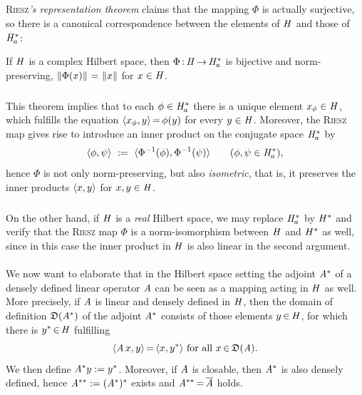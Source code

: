 \documentclass[11pt,twoside]{article}
\begin{document}
\begin{itemize}[leftmargin=4mm,itemsep=6pt]
\subparagraph{} %
\textsc{Riesz}\textit{'s representation theorem} claims
that the mapping $\Phi$ is actually surjective,
so there is a canonical correspondence
between the elements of $\mathit{H}$ and those of $\mathit{H}_a^*$:

\begin{theorem1}\label{RIESZ_REPRESENTATION_THEOREM}
If $\mathit{H}$ is a complex Hilbert space,
then $\Phi{\,:\,} \mathit{H} {\,\to\,} \mathit{H}_a^*$ is bijective and norm-preserving,
{\ie}
$\left\lVert \Phi(x) \right\rVert {\,=\,} \left\lVert x \right\rVert$ for $x \in \mathit{H}$.
\end{theorem1}

\subparagraph{}
This theorem implies that
to each $\phi \in \mathit{H}_a^*$
there is a unique element $x_{\phi} \in \mathit{H}$,
which fulfills the equation
$\langle x_{\phi},y \rangle {\,=\,} \phi(y)$ for every $y \in \mathit{H}$.
Moreover,
the \textsc{Riesz} map gives rise to introduce an inner product
on the conjugate space $\mathit{H}_a^*$ by
\[
\langle \phi,\psi \rangle \, \,:=\, \, \langle \Phi^{-1}(\phi),\Phi^{-1}(\psi) \rangle
\quad \quad (\phi,\psi \in \mathit{H}_a^*),
\]
hence $\Phi$ is not only norm-preserving,
but also \textit{isometric},
that is,
it preserves the inner products $\langle x,y \rangle$ for $x,y \in \mathit{H}$.

\subparagraph{} %
On the other hand,
if $\mathit{H}$ is a \textit{real} Hilbert space,
we may replace $\mathit{H}_a^*$ by $\mathit{H}^*$ and verify
that the \textsc{Riesz} map $\Phi$ is a norm-isomorphism
between $\mathit{H}$ and $\mathit{H}^*$ as well,
since in this case
the inner product in $\mathit{H}$ is also linear in the second argument.
\end{itemize}

\paragraph{} %
We now want to elaborate
that in the Hilbert space setting
the adjoint $\mathit{A}^*$ of a densely defined linear operator $\mathit{A}$
can be seen as a mapping acting in $\mathit{H}$ as well.
More precisely,
if $\mathit{A}$ is linear and densely defined in $\mathit{H}$,
then the domain of definition $\mathfrak{D}(\mathit{A}^*)$
of the adjoint $\mathit{A}^*$ consists of those elements $y {\,\in\,} \mathit{H}$,
for which there is $y^* {\,\in\,} \mathit{H}$ fulfilling
\[
\langle \mathit{A} \,x,y \rangle {\,=\,} \langle x,y^* \rangle \mbox{ for all } x {\,\in\,} \mathfrak{D}(\mathit{A}).
\]
We then define $\mathit{A}^* y := y^*$.
Moreover,
if $\mathit{A}$ is closable,
then $\mathit{A}^*$ is also densely defined,
hence
$\mathit{A}^{**} := (\mathit{A}^*)^*$ exists and $\mathit{A}^{**} {\,=\,} \overline{\mathit{A}}$
holds.
\end{document}

